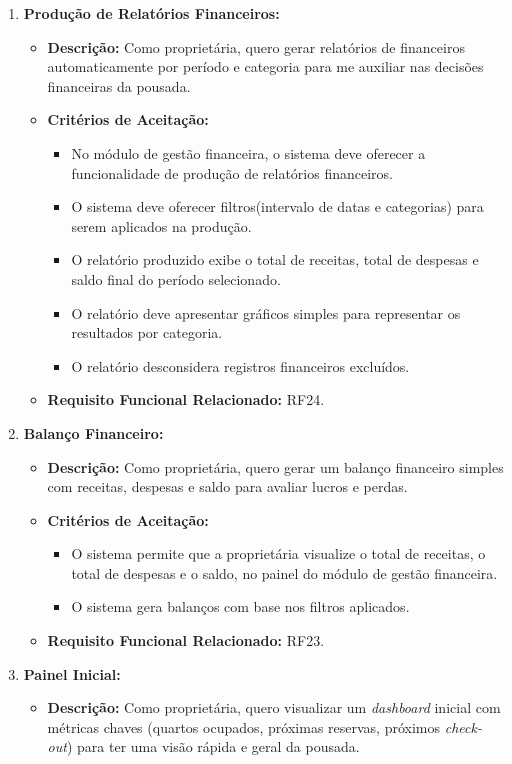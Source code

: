 \documentclass[
	12pt,				%
	openany,			%
	oneside,			%
	a4paper,			%
	english,			%
	french,				%
	spanish,			%
	brazil				%
	]{abntex2}
\begin{document}
\begin{enumerate}[label=\textbf{\arabic*.}]
\begin{itemize}
	\end{itemize} 
	\item \textbf{Produção de Relatórios Financeiros:}
	\begin{itemize}
		\item \textbf{Descrição:} Como proprietária, quero gerar relatórios de financeiros automaticamente por período e categoria para me auxiliar nas decisões financeiras da pousada.
		\item \textbf{Critérios de Aceitação:}
		\begin{itemize}
			\item No módulo de gestão financeira, o sistema deve oferecer a funcionalidade de produção de relatórios financeiros.
			\item O sistema deve oferecer filtros(intervalo de datas e categorias) para serem aplicados na produção.
			\item O relatório produzido exibe o total de receitas, total de despesas e saldo final do período selecionado.
			\item O relatório deve apresentar gráficos simples para representar os resultados por categoria.
			\item O relatório desconsidera registros financeiros excluídos.
		\end{itemize}
		\item \textbf{Requisito Funcional Relacionado:} RF24.
	\end{itemize} 
	\item \textbf{Balanço Financeiro:}
	\begin{itemize}
		\item \textbf{Descrição:} Como proprietária, quero gerar um balanço financeiro simples com receitas, despesas e saldo para avaliar lucros e perdas.
		\item \textbf{Critérios de Aceitação:}
		\begin{itemize}
			\item O sistema permite que a proprietária visualize o total de receitas, o total de despesas e o saldo, no painel do módulo de gestão financeira.
			\item O sistema gera balanços com base nos filtros aplicados.
		\end{itemize}
		\item \textbf{Requisito Funcional Relacionado:} RF23.
	\end{itemize} 
	\item \textbf{Painel Inicial:}
	\begin{itemize}
		\item \textbf{Descrição:} Como proprietária, quero visualizar um \textit{dashboard} inicial com métricas chaves (quartos ocupados, próximas reservas, próximos \textit{check-out}) para ter uma visão rápida e geral da pousada.

\end{itemize}
\end{enumerate}
\end{document}
